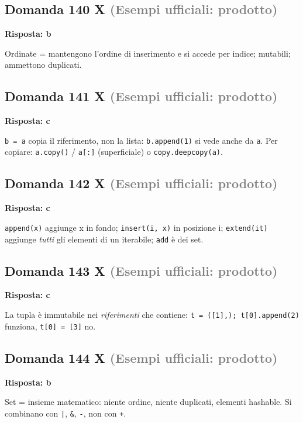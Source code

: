 \documentclass[a4paper,11pt]{article}
\begin{document}
\subsection*{Domanda 140 X \hfill {\small \textcolor{gray}{(Esempi ufficiali: prodotto)}}}
\textbf{Risposta: b}\par
Ordinate = mantengono l'ordine di inserimento e si accede per indice; mutabili; ammettono duplicati.



\subsection*{Domanda 141 X \hfill {\small \textcolor{gray}{(Esempi ufficiali: prodotto)}}}
\textbf{Risposta: c}\par
\texttt{b = a} copia il riferimento, non la lista: \texttt{b.append(1)} si vede anche da \texttt{a}. Per copiare: \texttt{a.copy()} / \texttt{a[:]} (superficiale) o \texttt{copy.deepcopy(a)}.



\subsection*{Domanda 142 X \hfill {\small \textcolor{gray}{(Esempi ufficiali: prodotto)}}}
\textbf{Risposta: c}\par
\texttt{append(x)} aggiunge x in fondo; \texttt{insert(i, x)} in posizione i; \texttt{extend(it)} aggiunge \textit{tutti} gli elementi di un iterabile; \texttt{add} è dei set.



\subsection*{Domanda 143 X \hfill {\small \textcolor{gray}{(Esempi ufficiali: prodotto)}}}
\textbf{Risposta: c}\par
La tupla è immutabile nei \textit{riferimenti} che contiene: \texttt{t = ([1],); t[0].append(2)} funziona, \texttt{t[0] = [3]} no.



\subsection*{Domanda 144 X \hfill {\small \textcolor{gray}{(Esempi ufficiali: prodotto)}}}
\textbf{Risposta: b}\par
Set = insieme matematico: niente ordine, niente duplicati, elementi hashable. Si combinano con \texttt{|}, \texttt{\&}, \texttt{-}, non con \texttt{+}.
\end{document}

